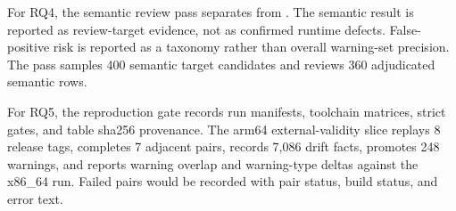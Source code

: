 For RQ4, the semantic review pass separates \truesemantic{} from
\truewrapper{}. The semantic result is reported as review-target evidence, not
as confirmed runtime defects. False-positive risk is reported as a taxonomy
rather than overall warning-set precision. The pass samples 400 semantic target
candidates and reviews 360 adjudicated semantic rows.



For RQ5, the reproduction gate records run manifests, toolchain matrices,
strict gates, and table sha256 provenance. The arm64 external-validity slice
replays 8 release tags, completes 7 adjacent pairs, records 7,086 drift facts,
promotes 248 warnings, and reports warning overlap and warning-type deltas
against the x86\_64 run. Failed pairs would be recorded with pair status, build
status, and error text.
